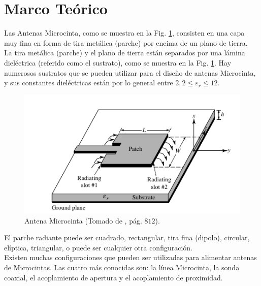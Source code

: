\documentclass[twocolumn]{IEEEtran}
\begin{document}
\section{Marco Teórico}
\noindent
Las Antenas Microcinta, como se muestra en la Fig. \ref{fig1}, consisten en una capa muy fina en forma de tira metálica (parche) por encima de un plano de tierra.\\
La tira metálica (parche) y el plano de tierra están separados por una lámina dieléctrica (referido como el sustrato), como se muestra en la Fig. \ref{fig1}. Hay numerosos sustratos que se pueden utilizar para el diseño de antenas Microcinta, y sus constantes dieléctricas están por lo general entre $2,2 \leq \varepsilon _r \leq 12$.
\begin{figure}[H]
	\centering
		\includegraphics[scale=0.6]{micro.png}
	\caption{Antena Microcinta (Tomado de \cite{balanice}, pág. $812$).}
	\label{fig1}
\end{figure}
\noindent
El parche radiante puede ser cuadrado, rectangular, tira fina (dipolo), circular, elíptica, triangular, o puede ser cualquier otra configuración.\\
Existen muchas configuraciones que pueden ser utilizadas para alimentar antenas de Microcintas. Las cuatro más conocidas son: la línea Microcinta, la sonda coaxial, el acoplamiento de apertura y el acoplamiento de proximidad.
\end{document}
